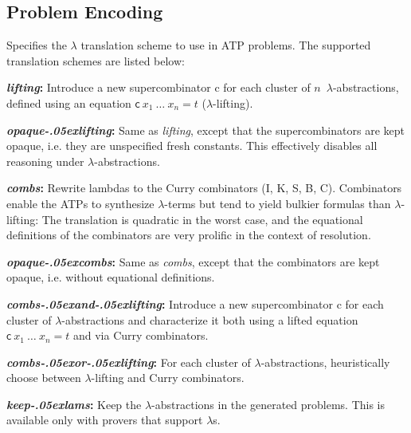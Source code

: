 \documentclass[a4paper,12pt]{article}
\newcommand\const[1]{\textsf{#1}}
\renewcommand\_{\hbox{\textunderscore\kern-.05ex}}
\begin{document}
\subsection{Problem Encoding}
\label{problem-encoding}

\newcommand\comb[1]{\const{#1}}

\begin{enum}
\opdefault{lam\_trans}{string}{smart}
Specifies the $\lambda$ translation scheme to use in ATP problems. The supported
translation schemes are listed below:

\begin{enum}
\item[\labelitemi] \textbf{\textit{lifting}:} Introduce a new
supercombinator \const{c} for each cluster of $n$~$\lambda$-abstractions,
defined using an equation $\const{c}~x_1~\ldots~x_n = t$ ($\lambda$-lifting).

\item[\labelitemi] \textbf{\textit{opaque\_lifting}:} Same as
\textit{lifting}, except that the supercombinators are kept opaque,
i.e. they are unspecified fresh constants. This effectively disables
all reasoning under $\lambda$-abstractions.

\item[\labelitemi] \textbf{\textit{combs}:} Rewrite lambdas to the Curry
combinators (\comb{I}, \comb{K}, \comb{S}, \comb{B}, \comb{C}). Combinators
enable the ATPs to synthesize $\lambda$-terms but tend to yield bulkier formulas
than $\lambda$-lifting: The translation is quadratic in the worst case, and the
equational definitions of the combinators are very prolific in the context of
resolution.

\item[\labelitemi] \textbf{\textit{opaque\_combs}:} Same as
\textit{combs}, except that the combinators are kept opaque, i.e. without
equational definitions.

\item[\labelitemi] \textbf{\textit{combs\_and\_lifting}:} Introduce a new
supercombinator \const{c} for each cluster of $\lambda$-abstractions and characterize it both using a
lifted equation $\const{c}~x_1~\ldots~x_n = t$ and via Curry combinators.

\item[\labelitemi] \textbf{\textit{combs\_or\_lifting}:} For each cluster of
$\lambda$-abstractions, heuristically choose between $\lambda$-lifting and Curry
combinators.

\item[\labelitemi] \textbf{\textit{keep\_lams}:}
Keep the $\lambda$-abstractions in the generated problems. This is available
only with provers that support $\lambda$s.


\end{enum}
\end{enum}
\end{document}
